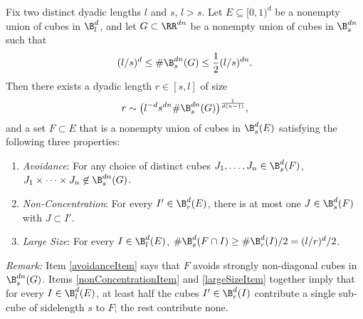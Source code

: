 \begin{lemma} \label{discretelemma}
	Fix two distinct dyadic lengths $l$ and $s$, $l > s$. Let $E \subseteq [0, 1)^d$ be a nonempty union of cubes in $\B^d_l$, and let $G\subset\RR^{dn}$ be a nonempty union of cubes in $\B_s^{dn}$ such that 
	\begin{equation}\label{ZsLarge}
	(l/s)^d \leq \# \B^{dn}_s(G)  \leq \frac{1}{2}(l/s)^{dn}.
	\end{equation} 
	Then there exists a dyadic length $r \in [s,l]$ of size
	\begin{equation} \label{rBound}
	 	r \sim \big(l^{-d}s^{dn} \# \B^{dn}_s(G)\big)^{\frac{1}{d(n-1)}},
	 \end{equation}
	 and a set $F \subset E$ that is a nonempty union of cubes in $\B^d_s(E)$ satisfying the following three properties:
	\begin{enumerate}
		\item\label{avoidanceItem} \emph{Avoidance}: For any choice of distinct cubes $J_1, \dots, J_n \in \B^d_s(F)$, $J_1 \times \dots \times J_n \not \in \B_s^{dn}(G)$.
		\item\label{nonConcentrationItem} \emph{Non-Concentration}: For every $I' \in \B_r^d(E)$, there is at most one $J \in \B_s^d(F)$ with $J \subset I'$.
		\item\label{largeSizeItem} \emph{Large Size}: For every $I \in \B^d_l(E)$, $\# \B^d_s(F \cap I) \geq \# \B^d_r(I) / 2 = (l/r)^d / 2$.
	\end{enumerate}
	\end{lemma}
	{\em{Remark: }} Item \ref{avoidanceItem} says that $F$ avoids strongly non-diagonal cubes in $\B^{dn}_s(G)$. Items \ref{nonConcentrationItem} and \ref{largeSizeItem} together imply that for every $I \in \B^d_l(E)$, at least half the cubes $I'\in \B_r^d(I)$ contribute a single sub-cube of sidelength $s$ to $F$; the rest contribute none.  

